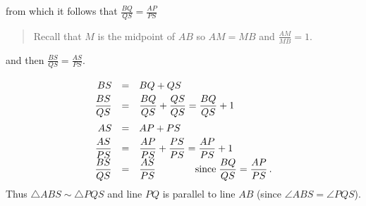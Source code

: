 from which it follows that $\frac{BQ}{QS}=\frac{AP}{PS}$
\begin{quote}
\vspace*{-8pt}
Recall that $M$ is the midpoint of $AB$ so $AM=MB$ and $\frac{AM}{MB}=1$.
\vspace*{-8pt}
\end{quote}
and then $\frac{BS}{QS}=\frac{AS}{PS}$.
\[
\renewcommand*{\arraystretch}{1.7}
\begin{array}{rcl}
BS&=&BQ+QS\\
\disfrac{BS}{QS}&=&\disfrac{BQ}{QS}+\disfrac{QS}{QS} = \disfrac{BQ}{QS}+1\\
AS&=&AP+PS\\
\disfrac{AS}{PS} &=& \disfrac{AP}{PS} + \disfrac{PS}{PS} = \disfrac{AP}{PS} + 1\\
\disfrac{BS}{QS}&=&\disfrac{AS}{PS} \quad\quad\quad\quad \textrm{since}\;\disfrac{BQ}{QS}=\disfrac{AP}{PS}\,.
\end{array}
\]
Thus $\triangle ABS \sim \triangle PQS$ and line $PQ$ is parallel to line $AB$ (since $\angle ABS = \angle PQS$).

